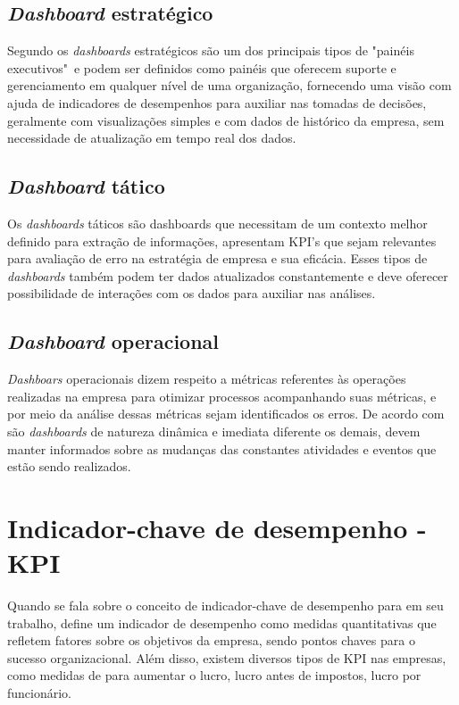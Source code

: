 \documentclass[
	12pt,				%
	openright,			%
	oneside,			%
	a4paper,			%
	english,			%
	brazil				%
	]{abntex2}
\begin{document}
\subsection{\textit{Dashboard} estratégico}
 Segundo \cite{few2003information} os \textit{dashboards} estratégicos são um dos principais tipos de "painéis executivos"\ e podem ser definidos como painéis que oferecem suporte e gerenciamento em qualquer nível de uma organização, fornecendo uma visão com ajuda de indicadores de desempenhos para auxiliar nas tomadas de decisões, geralmente com visualizações simples e com dados de histórico da empresa, sem necessidade de atualização em tempo real dos dados.

\subsection{\textit{Dashboard} tático}
Os \textit{dashboards} táticos são dashboards que necessitam de um contexto melhor definido para extração de informações, apresentam KPI's que sejam relevantes para avaliação de erro na estratégia de empresa e sua eficácia. Esses tipos de \textit{dashboards} também podem ter dados atualizados constantemente e deve oferecer possibilidade de interações com os dados para auxiliar nas análises.

\subsection{\textit{Dashboard} operacional}
\textit{Dashboars} operacionais dizem respeito a métricas referentes às operações realizadas na empresa para otimizar processos acompanhando suas métricas, e por meio da análise dessas métricas sejam identificados os erros. De acordo com \cite{few2009now} são  \textit{dashboards} de natureza dinâmica e imediata diferente os demais, devem manter informados sobre as mudanças das constantes atividades e eventos que estão sendo realizados.

\section{Indicador-chave de desempenho - KPI}

Quando se fala sobre o conceito de indicador-chave de desempenho para \cite{mckie2009introduction} em seu trabalho, define um indicador de desempenho como medidas quantitativas que refletem fatores sobre os objetivos da empresa, sendo pontos chaves para o sucesso organizacional. Além disso, existem diversos tipos de KPI nas empresas, como medidas de para aumentar o lucro, lucro antes de impostos, lucro por funcionário.
\end{document}
